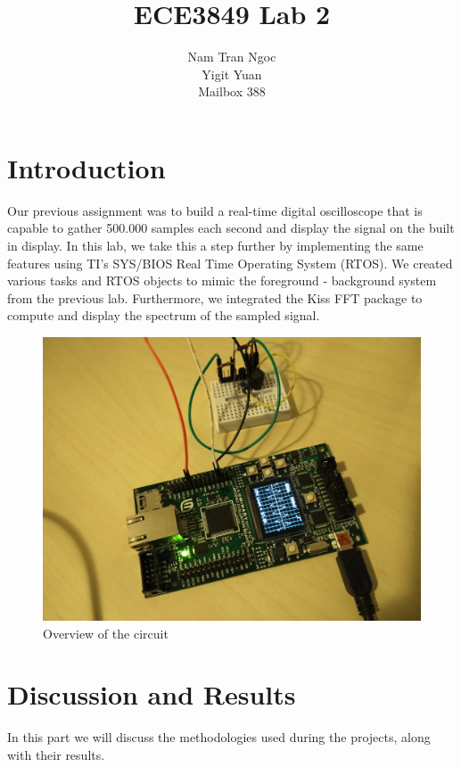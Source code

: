 \documentclass[12pt,oneside,letterpaper]{article}
\title{	ECE3849 Lab 2}
\author{Nam Tran Ngoc\\
		Yigit Yuan\\
    Mailbox 388}
\begin{document}
\maketitle
\cleardoublepage
\section{Introduction}
Our previous assignment was to build a real-time digital oscilloscope that is capable to gather 500.000 samples each second and display the signal on the built in display. In this lab, we take this a step further by implementing the same features using TI’s SYS/BIOS Real Time Operating System (RTOS). We created various tasks and RTOS objects to mimic the foreground - background system from the previous lab. Furthermore, we integrated the Kiss FFT package to compute and display the spectrum of the sampled signal. 

\begin{figure}[h]
  \includegraphics[width=\linewidth]{assets/overview.jpg}
  \caption{Overview of the circuit}
  \label{fig:overview}
\end{figure}

\section{Discussion and Results}
In this part we will discuss the methodologies used during the projects, along with their results.
\end{document}
